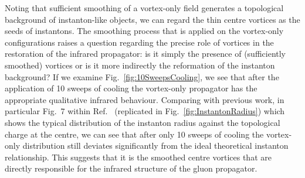 %
Noting that sufficient smoothing of a vortex-only field generates a topological background of instanton-like objects, we can regard the thin centre vortices as the seeds of instantons. The smoothing process that is applied on the vortex-only configurations raises a question regarding the precise role of vortices in the restoration of the infrared propagator: is it simply the presence of (sufficiently smoothed) vortices or is it more indirectly the reformation of the instanton background? If we examine Fig.~\ref{fig:10SweepsCooling}, we see that after the application of 10 sweeps of cooling the vortex-only propagator has the appropriate qualitative infrared behaviour. Comparing with previous work, in particular Fig.~7 within Ref.~\cite{Trewartha:2015ida} (replicated in Fig.~\ref{fig:InstantonRadius}) which shows the typical distribution of the instanton radius against the topological charge at the centre, we can see that after only 10 sweeps of cooling the vortex-only distribution still deviates significantly from the ideal theoretical instanton relationship. This suggests that it is the smoothed centre vortices that are directly responsible for the infrared structure of the gluon propagator.